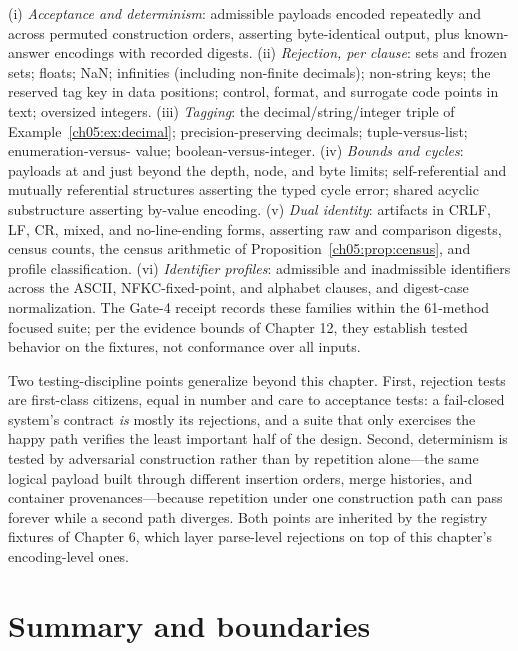 \begin{checkclass}\label{ch05:check:fixtures}
(i) \emph{Acceptance and determinism}: admissible payloads encoded
repeatedly and across permuted construction orders, asserting
byte-identical output, plus known-answer encodings with recorded
digests. (ii) \emph{Rejection, per clause}: sets and frozen sets;
floats; NaN; infinities (including non-finite decimals); non-string
keys; the reserved tag key in data positions; control, format, and
surrogate code points in text; oversized integers. (iii) \emph{Tagging}:
the decimal/string/integer triple of Example~\ref{ch05:ex:decimal};
precision-preserving decimals; tuple-versus-list; enumeration-versus-
value; boolean-versus-integer. (iv) \emph{Bounds and cycles}: payloads
at and just beyond the depth, node, and byte limits; self-referential
and mutually referential structures asserting the typed cycle error;
shared acyclic substructure asserting by-value encoding. (v) \emph{Dual
identity}: artifacts in CRLF, LF, CR, mixed, and no-line-ending forms,
asserting raw and comparison digests, census counts, the census
arithmetic of Proposition~\ref{ch05:prop:census}, and profile
classification. (vi) \emph{Identifier profiles}: admissible and
inadmissible identifiers across the ASCII, NFKC-fixed-point, and
alphabet clauses, and digest-case normalization. The Gate-4 receipt
records these families within the 61-method focused suite; per the
evidence bounds of Chapter 12, they establish tested behavior on the
fixtures, not conformance over all inputs.
\end{checkclass}

Two testing-discipline points generalize beyond this chapter. First,
rejection tests are first-class citizens, equal in number and care to
acceptance tests: a fail-closed system's contract \emph{is} mostly its
rejections, and a suite that only exercises the happy path verifies the
least important half of the design. Second, determinism is tested by
adversarial construction rather than by repetition alone---the same
logical payload built through different insertion orders, merge
histories, and container provenances---because repetition under one
construction path can pass forever while a second path diverges. Both
points are inherited by the registry fixtures of Chapter 6, which
layer parse-level rejections on top of this chapter's encoding-level
ones.

\section{Summary and boundaries}\label{ch05:summary}

